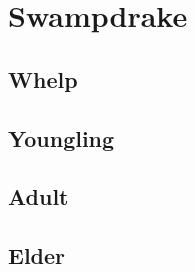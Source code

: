 \section{Swampdrake}

\subsection{Whelp}

\subsection{Youngling}

\subsection{Adult}

\subsection{Elder}